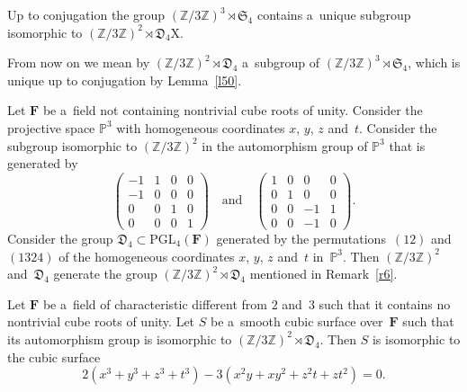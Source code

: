 \documentclass[10pt,a4paper]{amsart}
\begin{document}
\begin{lemma}
\label{l50}
Up to conjugation the group $(\mathbb{Z}/3\mathbb{Z})^3 \rtimes \mathfrak{S}_4$ contains a~unique subgroup isomorphic to $(\mathbb{Z}/3\mathbb{Z})^2 \rtimes \mathfrak{D}_4$X.
\end{lemma}

\begin{remark}
\label{r6}
From now on we mean by $(\mathbb{Z}/3\mathbb{Z})^2 \rtimes \mathfrak{D}_4$ a~subgroup of $(\mathbb{Z}/3\mathbb{Z})^3 \rtimes \mathfrak{S}_4$, which is unique up to conjugation by Lemma~\ref{l50}.
\end{remark}

\begin{example}
\label{e4}
Let $\mathbf{F}$ be a~field not containing nontrivial cube roots of unity. Consider the projective space $\mathbb{P}^3$ with homogeneous coordinates $x$, $y$, $z$ and~$t$. Consider the subgroup isomorphic to $(\mathbb{Z}/3\mathbb{Z})^2$ in the automorphism group of $\mathbb{P}^3$ that is generated by
\begin{equation}
\label{eq7.4}
\begin{pmatrix}
-1 & 1 & 0 & 0\\
-1 & 0 & 0 & 0\\
0 & 0 & 1 & 0\\
0 & 0 & 0 & 1
\end{pmatrix} \quad \text{and} \quad
\begin{pmatrix}
1 & 0 & 0 & 0\\
0 & 1 & 0 & 0\\
0 & 0 & -1 & 1\\
0 & 0 & -1 & 0
\end{pmatrix}.
\end{equation}
Consider the group $\mathfrak{D}_4 \subset \mathrm{PGL}_4(\mathbf{F})$ generated by the permutations~$(12)$ and~$(1324)$ of the homogeneous coordinates $x$, $y$, $z$ and~$t$ in~$\mathbb{P}^3$. Then $(\mathbb{Z}/3\mathbb{Z})^2$ and~$\mathfrak{D}_4$ generate the group $(\mathbb{Z}/3\mathbb{Z})^2 \rtimes \mathfrak{D}_4$ mentioned in Remark~\ref{r6}.
\end{example}

\begin{lemma}
\label{l53}
Let $\mathbf{F}$ be a~field of characteristic different from $2$ and~$3$ such that it contains no nontrivial cube roots of unity. Let $S$ be a~smooth cubic surface over~$\mathbf{F}$ such that its automorphism group is isomorphic to $(\mathbb{Z}/3\mathbb{Z})^2 \rtimes \mathfrak{D}_4$. Then $S$ is isomorphic to the cubic surface
$$
2(x^3+y^3+z^3+t^3)-3(x^2y+xy^2+z^2t+zt^2)=0.
$$
\end{lemma}
\end{document}
